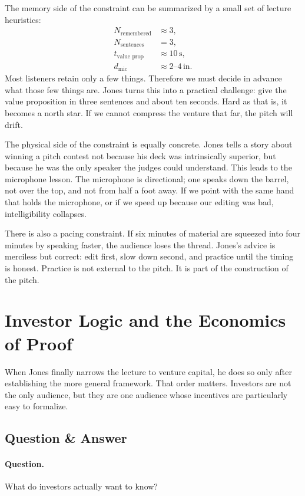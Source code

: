 The memory side of the constraint can be summarized by a small set of lecture heuristics:
\begin{align}
N_{\text{remembered}} &\approx 3,\\
N_{\text{sentences}} &= 3,\\
t_{\text{value prop}} &\approx 10\,\text{s},\\
d_{\text{mic}} &\approx 2\text{--}4\,\text{in}.
\end{align}
Most listeners retain only a few things. Therefore we must decide in advance what those few things are. Jones turns this into a practical challenge: give the value proposition in three sentences and about ten seconds. Hard as that is, it becomes a north star. If we cannot compress the venture that far, the pitch will drift.

The physical side of the constraint is equally concrete. Jones tells a story about winning a pitch contest not because his deck was intrinsically superior, but because he was the only speaker the judges could understand. This leads to the microphone lesson. The microphone is directional; one speaks down the barrel, not over the top, and not from half a foot away. If we point with the same hand that holds the microphone, or if we speed up because our editing was bad, intelligibility collapses.

There is also a pacing constraint. If six minutes of material are squeezed into four minutes by speaking faster, the audience loses the thread. Jones's advice is merciless but correct: edit first, slow down second, and practice until the timing is honest. Practice is not external to the pitch. It is part of the construction of the pitch.

\section{Investor Logic and the Economics of Proof}

When Jones finally narrows the lecture to venture capital, he does so only after establishing the more general framework. That order matters. Investors are not the only audience, but they are one audience whose incentives are particularly easy to formalize.

\subsection{Question \& Answer}

\paragraph{Question.} What do investors actually want to know?

